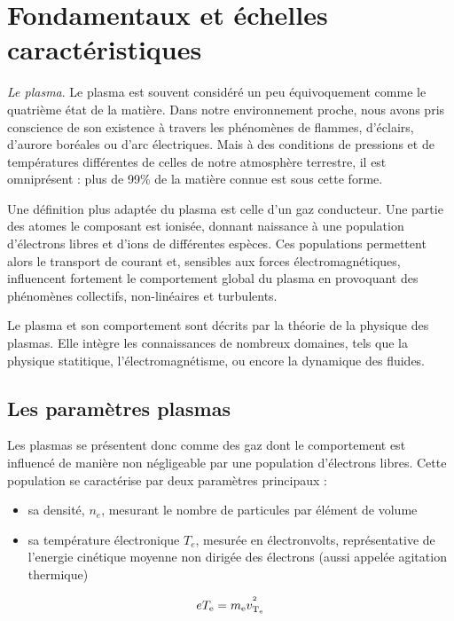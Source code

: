\label{Introduction}
\section{Fondamentaux et échelles caractéristiques}

\emph{Le plasma}. Le plasma est souvent considéré un peu équivoquement comme le
quatrième état de la matière. Dans notre environnement proche, nous avons pris
conscience de son existence à travers les phénomènes de flammes, d'éclairs,
d'aurore boréales ou d'arc électriques. Mais à des conditions de pressions et de
températures différentes de celles de notre atmosphère terrestre, il est
omniprésent : plus de 99\% de la matière connue est sous cette forme.

Une définition plus adaptée du plasma est celle d'un gaz conducteur. Une partie
des atomes le composant est ionisée, donnant naissance à une population
d'électrons libres et d'ions de différentes espèces. Ces populations permettent
alors le transport de courant et, sensibles aux forces électromagnétiques,
influencent fortement le comportement global du plasma en provoquant des
phénomènes collectifs, non-linéaires et turbulents.

Le plasma et son comportement sont décrits par la théorie de la physique des
plasmas. Elle intègre les connaissances de nombreux domaines, tels que la
physique statitique, l'électromagnétisme, ou encore la dynamique des fluides.

\subsection{Les paramètres plasmas}
Les plasmas se présentent donc comme des gaz dont le comportement est influencé
de manière non négligeable par une population d'électrons libres. Cette population
se caractérise par deux paramètres principaux :

\begin{itemize}
  \item sa densité, $n_e$, mesurant le nombre de particules par élément de volume
  \item sa température électronique $T_e$, mesurée en électronvolts, représentative
   de l'energie cinétique moyenne non dirigée des électrons (aussi appelée
   agitation thermique)
\end{itemize}

\begin{equation}
	eT_\text{e}=m_\text{e} v_{\text{T}_\text{e}}^{^{2}}
\end{equation}

